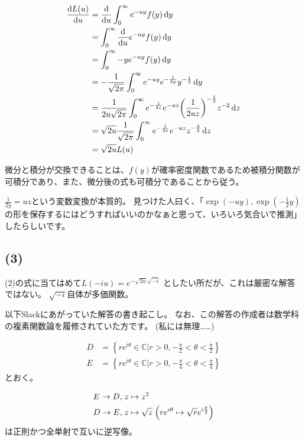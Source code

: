\documentclass[a4paper, 10pt, dvipdfmx]{jlreq}
\begin{document}
\begin{align*}
  \dv{L(u)}{u} & =\dv{u} \int_0^{\infty} {e^{-uy}f(y)}\dd{y}                                                                        \\
               & =\int_0^{\infty} \dv{u} e^{-uy}f(y) \dd{y}                                                                         \\
               & =\int_0^{\infty}  {-y e^{-uy}f(y)} \dd{y}                                                                          \\
               & =-\frac{1}{\sqrt{2\pi}}\int_0^{\infty}  {e^{-uy}e^{-\frac{1}{2y}}y^{-\frac{1}{2}}} \dd{y}                          \\
               & =\frac{1}{2u\sqrt{2\pi}} \int_0^{\infty} {e^{-\frac{1}{2z}}e^{-uz}\qty(\frac{1}{2uz})^{-\frac{1}{2}}z^{-2}} \dd{z} \\
               & =\sqrt{2u}\frac{1}{\sqrt{2\pi}}\int_0^\infty e^{-\frac{1}{2z}}e^{-uz}z^{-\frac{3}{2}} \dd{z}                       \\
               & =\sqrt{2u}L(u)
\end{align*}

微分と積分が交換できることは、$f(y)$が確率密度関数であるため被積分関数が可積分であり、また、微分後の式も可積分であることから従う。

$\frac{1}{2y}=uz$という変数変換が本質的。
見つけた人曰く、「$\exp(-uy),\exp(-\frac{1}{2}y)$の形を保存するにはどうすればいいのかなぁと思って、いろいろ気合いで推測」したらしいです。

\subsection*{(3)}

(2)の式に当てはめて$L(-iu)=e^{-\sqrt{2u}\sqrt{-i}}$
としたい所だが、これは厳密な解答ではない。
$\sqrt{-i}$自体が多価関数。

以下Slackにあがっていた解答の書き起こし。
なお、この解答の作成者は数学科の複素関数論を履修されていた方です。
(私には無理……)

\begin{align*}
  D & =\left\{ re^{i\theta}\in \mathbb{C} | r>0, -\frac{\pi}{2} < \theta < \frac{\pi}{2} \right\} \\
  E & =\left\{ re^{i\theta}\in \mathbb{C} | r>0, -\frac{\pi}{4} < \theta < \frac{\pi}{4} \right\}
\end{align*}
とおく。

\begin{align*}
  E \to D, \; & z \mapsto z^2                                                                  \\
  D \to E, \; & z \mapsto \sqrt{z} \; \qty(re^{i\theta} \mapsto \sqrt{r}e^{i\frac{\theta}{2}})
\end{align*}
は正則かつ全単射で互いに逆写像。
\end{document}
